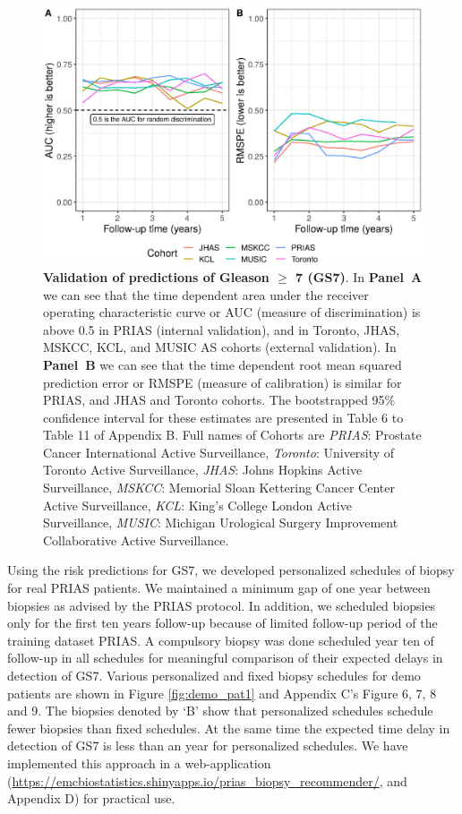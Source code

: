 \begin{figure}
\centerline{\includegraphics[width=\columnwidth]{images/auc_pe.eps}}
\caption{\textbf{Validation of predictions of Gleason $\geq$ 7 (GS7)}. In \textbf{Panel~A} we can see that the time dependent area under the receiver operating characteristic curve or AUC (measure of discrimination) is above 0.5 in PRIAS (internal validation), and in Toronto, JHAS, MSKCC, KCL, and MUSIC AS cohorts (external validation). In \textbf{Panel~B} we can see that the time dependent root mean squared prediction error or RMSPE (measure of calibration) is similar for PRIAS, and JHAS and Toronto cohorts. The bootstrapped 95\% confidence interval for these estimates are presented in Table 6 to Table 11 of Appendix B. Full names of Cohorts are \textit{PRIAS}: Prostate Cancer International Active Surveillance, \textit{Toronto}: University of Toronto Active Surveillance, \textit{JHAS}: Johns Hopkins Active Surveillance, \textit{MSKCC}: Memorial Sloan Kettering Cancer Center Active Surveillance, \textit{KCL}: King's College London Active Surveillance, \textit{MUSIC}: Michigan Urological Surgery Improvement Collaborative Active Surveillance.}
\label{fig:auc_pe}
\end{figure}

Using the risk predictions for GS7, we developed personalized schedules of biopsy for real PRIAS patients. We maintained a minimum gap of one year between biopsies as advised by the PRIAS protocol. In addition, we scheduled biopsies only for the first ten years follow-up because of limited follow-up period of the training dataset PRIAS. A compulsory biopsy was done scheduled year ten of follow-up in all schedules for meaningful comparison of their expected delays in detection of GS7. Various personalized and fixed biopsy schedules for demo patients are shown in Figure \ref{fig:demo_pat1} and Appendix C's Figure 6, 7, 8 and 9. The biopsies denoted by `B' show that personalized schedules schedule fewer biopsies than fixed schedules. At the same time the expected time delay in detection of GS7 is less than an year for personalized schedules. We have implemented this approach in a web-application (\url{https://emcbiostatistics.shinyapps.io/prias_biopsy_recommender/}, and Appendix D) for practical use.